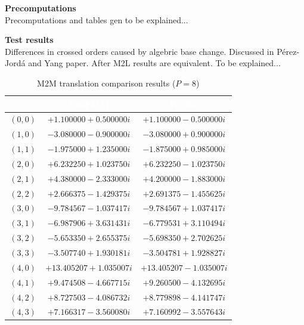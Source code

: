 \documentclass[10pt,dvipsnames,table]{article}
\begin{document}
\vspace{0.4em}
\noindent\textbf{Precomputations}\\[0.2em]
Precomputations and tables gen to be explained...

\vspace{0.8em}
\noindent\textbf{Test results}\\[0.2em]
Differences in crossed orders caused by algebric base change. Discussed in Pérez-Jordá and Yang paper. 
After M2L results are equivalent.
To be explained...

\begin{table}[H]
\centering
\caption{M2M translation comparison results ($P=8$)}\label{tbl:m2m_results}
\small
\renewcommand{\arraystretch}{1.1}
\begin{tabular}{@{}ccc@{}}
\rowcolor{TableHead}
\textcolor{white}{\textbf{$(l, m)$}} &
\textcolor{white}{\textbf{ExaFMM}} &
\textcolor{white}{\textbf{WSE-3}} \\
\midrule
$(0, 0)$ & $+1.100000 + 0.500000i$ & $+1.100000 - 0.500000i$ \\ \rowcolor{TableRowAlt}
$(1, 0)$ & $-3.080000 - 0.900000i$ & $-3.080000 + 0.900000i$ \\
$(1, 1)$ & $-1.975000 + 1.235000i$ & $-1.875000 + 0.985000i$ \\ \rowcolor{TableRowAlt}
$(2, 0)$ & $+6.232250 + 1.023750i$ & $+6.232250 - 1.023750i$ \\
$(2, 1)$ & $+4.380000 - 2.333000i$ & $+4.200000 - 1.883000i$ \\ \rowcolor{TableRowAlt}
$(2, 2)$ & $+2.666375 - 1.429375i$ & $+2.691375 - 1.455625i$ \\
$(3, 0)$ & $-9.784567 - 1.037417i$ & $-9.784567 + 1.037417i$ \\ \rowcolor{TableRowAlt}
$(3, 1)$ & $-6.987906 + 3.631431i$ & $-6.779531 + 3.110494i$ \\
$(3, 2)$ & $-5.653350 + 2.655375i$ & $-5.698350 + 2.702625i$ \\ \rowcolor{TableRowAlt}
$(3, 3)$ & $-3.507740 + 1.930181i$ & $-3.504781 + 1.928827i$ \\
$(4, 0)$ & $+13.405207 + 1.035007i$ & $+13.405207 - 1.035007i$ \\ \rowcolor{TableRowAlt}
$(4, 1)$ & $+9.474508 - 4.667715i$ & $+9.260500 - 4.132695i$ \\
$(4, 2)$ & $+8.727503 - 4.086732i$ & $+8.779898 - 4.141747i$ \\ \rowcolor{TableRowAlt}
$(4, 3)$ & $+7.166317 - 3.560080i$ & $+7.160992 - 3.557643i$ \\

\end{tabular}
\end{table}
\end{document}
